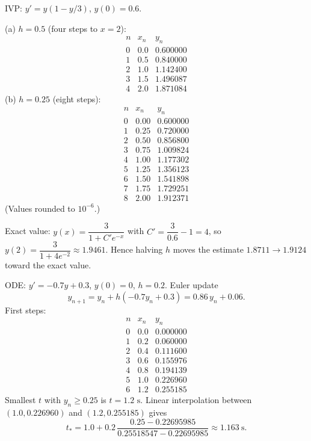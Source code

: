 \documentclass[11pt]{article}
\def\textbf#1{#1}%
\def\mathbf#1{#1}%
\begin{document}
\begin{solution}
IVP: $y' = y(1-y/3)$, $y(0)=0.6$.

\textbf{(a) $h=0.5$ (four steps to $x=2$):}
\[
\begin{array}{c|c|c}
n & x_n & y_n\\\hline
0&0.0&0.600000\\
1&0.5&0.840000\\
2&1.0&1.142400\\
3&1.5&1.496087\\
4&2.0&\mathbf{1.871084}
\end{array}
\]
\textbf{(b) $h=0.25$ (eight steps):}
\[
\begin{array}{c|c|c}
n & x_n & y_n\\\hline
0&0.00&0.600000\\
1&0.25&0.720000\\
2&0.50&0.856800\\
3&0.75&1.009824\\
4&1.00&1.177302\\
5&1.25&1.356123\\
6&1.50&1.541898\\
7&1.75&1.729251\\
8&2.00&\mathbf{1.912371}
\end{array}
\]
(Values rounded to $10^{-6}$.)

Exact value: $y(x)=\dfrac{3}{1+C'e^{-x}}$ with $C'=\dfrac{3}{0.6}-1=4$, so
$y(2)=\dfrac{3}{1+4e^{-2}}\approx 1.9461$.
Hence halving $h$ moves the estimate $1.8711\to 1.9124$ toward the exact value.
\end{solution}

\begin{solution}
ODE: $y'=-0.7y+0.3$, $y(0)=0$, $h=0.2$.
Euler update
\[
y_{n+1}=y_n+h(-0.7y_n+0.3)=0.86\,y_n+0.06.
\]
First steps:
\[
\begin{array}{c|c|c}
n & x_n & y_n\\\hline
0&0.0&0.000000\\
1&0.2&0.060000\\
2&0.4&0.111600\\
3&0.6&0.155976\\
4&0.8&0.194139\\
5&1.0&0.226960\\
6&1.2&\mathbf{0.255185}
\end{array}
\]
Smallest $t$ with $y_n\ge 0.25$ is $\boxed{t=1.2\text{ s}}$.
Linear interpolation between $(1.0,0.226960)$ and $(1.2,0.255185)$ gives
\[
t_\ast=1.0 + 0.2\,\frac{0.25-0.22695985}{0.25518547-0.22695985}
\approx \boxed{1.163\ \text{s}}.
\]
\end{solution}
\end{document}

